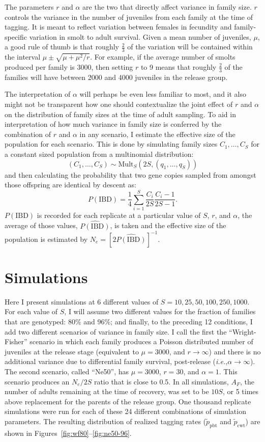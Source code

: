 \documentclass[11pt]{article}
\newcommand{\ie}{{\em i.e.},\xspace }
\begin{document}
The parameters $r$ and $\alpha$ are the two that directly affect variance in family size.  $r$ 
controls the variance in the number of juveniles from each family at the time of tagging.  It is meant
to reflect variation between females in fecundity and family-specific variation in smolt to adult survival.  
Given a mean number of juveniles, $\mu$, a good rule of thumb is that roughly $\frac{2}{3}$ 
of the variation will be contained
within the interval $\mu \pm \sqrt{\mu + \mu^2/r}$.  For example, if the average number of smolts produced
per family is 3000, then setting $r$ to 9 means that roughly $\frac{2}{3}$ of the families will have
between 2000 and 4000 juveniles in the release group.


The interpretation of $\alpha$ will perhaps be even less familiar to most, and it also might not
be transparent how one should contextualize the joint effect of $r$ and $\alpha$ on the distribution
of family sizes at the time of adult sampling.  To aid in interpretation of how much variance in
family size is conferred by the combination of $r$ and $\alpha$ in any scenario, I estimate the
effective size of the population for each scenario.  This is done by simulating family sizes $C_1,\ldots,C_S$
for a constant sized population from a multinomial distribution:
\[
(C_1,\ldots, C_S) \sim \mathrm{Mult}_S(2S, (q_1, \ldots, q_S))
\]
and then calculating the probability that two gene copies sampled from amongst those offspring
are identical by descent as:
\[
P(\mathrm{IBD}) = \frac{1}{4}\sum_{i=1}^S \frac{C_i}{2S}\frac{C_i - 1}{2S - 1}.
\]
$P(\mathrm{IBD})$ is recorded for each replicate at a particular value of $S$, $r$, and $\alpha$, the average
of those values, $\widehat{P(\mathrm{IBD})}$, is taken and the effective size of the population is estimated
by $N_e = [2\widehat{P(\mathrm{IBD})}]^{-1}$. 

\section{Simulations}
Here I present simulations at 6 different values of $S = 10, 25, 50, 100, 250, 1000$.  For each value of $S$,
I will assume two different values for the fraction of families that are genotyped: 80\% and 96\%; and 
finally, to the preceding 12 conditions, I add two different scenarios of variance in family size. I call
the first the ``Wright-Fisher'' scenario in which each family produces a Poisson distributed number of
juveniles at the release stage (equivalent to $\mu=3000$, and $r\rightarrow\infty$) and there is no
additional variance due to differential family 
survival, post-release (\ie $\alpha \rightarrow \infty$). The second scenario, called ``Ne50'', has
$\mu = 3000$, $r = 30$, and $\alpha = 1$.  This scenario produces an $N_e/2S$ ratio that is close to
0.5.  In all simulations, $A_F$, the number of adults remaining at the time of recovery, was set to 
be $10S$, or 5 times above replacement for the parents of the release group. One thousand replicate simulations were run for each of these 24 different combinations of simulation parameters. The resulting distribution of realized tagging
rates ($\tilde{p}_\mathrm{pbt}$ and $\tilde{p}_\mathrm{cwt}$)
are shown in Figures~\ref{fig:wf80}--\ref{fig:ne50-96}.
\end{document}
